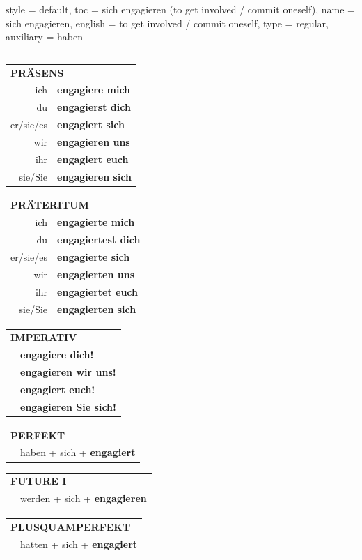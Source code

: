 \begin{verbentry}{
  style = {default},
  toc = {sich engagieren (to get involved / commit oneself)},
  name = {sich engagieren},
  english = {to get involved / commit oneself},
  type = {regular},
  auxiliary = {haben}
}


\vspace{5pt}
\hrule
\vspace{5pt}

\begin{tabular}{rl}
\multicolumn{2}{l}{\textbf{PRÄSENS}}\\
ich & \textbf{engagiere mich}\\
du & \textbf{engagierst dich}\\
er/sie/es & \textbf{engagiert sich}\\
wir & \textbf{engagieren uns}\\
ihr & \textbf{engagiert euch}\\
sie/Sie & \textbf{engagieren sich}\\
\end{tabular}
\hfill
\begin{tabular}{rl}
\multicolumn{2}{l}{\textbf{PRÄTERITUM}}\\
ich & \textbf{engagierte mich}\\
du & \textbf{engagiertest dich}\\
er/sie/es & \textbf{engagierte sich}\\
wir & \textbf{engagierten uns}\\
ihr & \textbf{engagiertet euch}\\
sie/Sie & \textbf{engagierten sich}\\
\end{tabular}
\hfill
\begin{tabular}{rl}
\multicolumn{2}{l}{\textbf{IMPERATIV}}\\
& \textbf{engagiere dich!}\\
& \textbf{engagieren wir uns!}\\
& \textbf{engagiert euch!}\\
& \textbf{engagieren Sie sich!}\\
\end{tabular}

\vspace{10pt}

\begin{tabular}{rl}
\multicolumn{2}{l}{\textbf{PERFEKT}}\\
& haben + sich + \textbf{engagiert}\\
\end{tabular}
\hfill
\begin{tabular}{rl}
\multicolumn{2}{l}{\textbf{FUTURE I}}\\
& werden + sich + \textbf{engagieren}\\
\end{tabular}
\hfill
\begin{tabular}{rl}
\multicolumn{2}{l}{\textbf{PLUSQUAMPERFEKT}}\\
& hatten + sich + \textbf{engagiert}\\
\end{tabular}


\end{verbentry}
